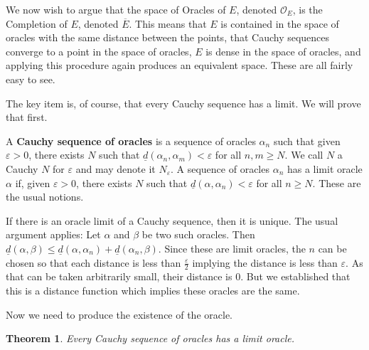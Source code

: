 \documentclass[12pt]{article}
\newtheorem{theorem}{Theorem}[section]
\begin{document}
We now wish to argue that the space of Oracles of $E$, denoted $\mathcal{O}_E$, is the Completion of $E$, denoted $\overline{E}$. This means that $E$ is contained in the space of oracles with the same distance between the points, that Cauchy sequences converge to a point in the space of oracles, $E$ is dense in the space of oracles, and applying this procedure again produces an equivalent space. These are all fairly easy to see.

The key item is, of course, that every Cauchy sequence has a limit. We will prove that first.  

A \textbf{Cauchy sequence of oracles} is a sequence of oracles $\alpha_n$ such that given $\varepsilon > 0$, there exists $N$ such that $\underline{d}(\alpha_n, \alpha_m) < \varepsilon$ for all $n, m \geq N$. We call $N$ a Cauchy $N$ for $\varepsilon$ and may denote it $N_{\varepsilon}$. A sequence of oracles $\alpha_n$ has a limit oracle $\alpha$ if, given $\varepsilon > 0$, there exists $N$ such that $\underline{d}(\alpha, \alpha_n) < \varepsilon$ for all $n \geq N$. These are the usual notions. 

If there is an oracle limit of a Cauchy sequence, then it is unique. The usual argument applies: Let $\alpha$ and $\beta$ be two such oracles. Then $\underline{d}(\alpha, \beta) \leq \underline{d}(\alpha, \alpha_n) + \underline{d}(\alpha_n, \beta)$. Since these are limit oracles, the $n$ can be chosen so that each distance is less than $\frac{\varepsilon}{2}$ implying the distance is less than $\varepsilon$. As that can be taken arbitrarily small, their distance is 0. But we established that this is a distance function which implies these oracles are the same. 

Now we need to produce the existence of the oracle. 

\begin{theorem}
    Every Cauchy sequence of oracles has a limit oracle. 
\end{theorem}
\end{document}
